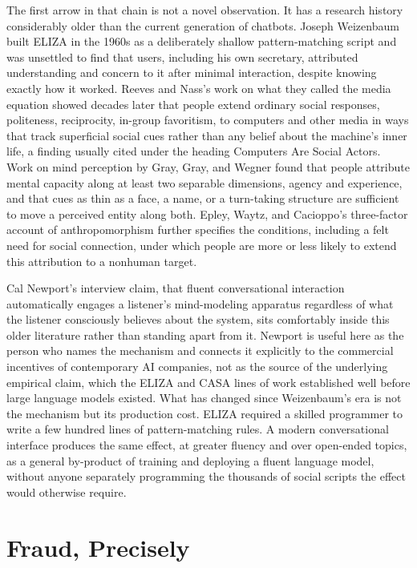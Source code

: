 \documentclass[11pt]{article}
\begin{document}
The first arrow in that chain is not a novel observation. It has a research history considerably older than the current generation of chatbots. Joseph Weizenbaum built ELIZA in the 1960s\cite{weizenbaum} as a deliberately shallow pattern-matching script and was unsettled to find that users, including his own secretary, attributed understanding and concern to it after minimal interaction, despite knowing exactly how it worked. Reeves and Nass's work on what they called the media equation\cite{reevesnass,nasssteuertauber} showed decades later that people extend ordinary social responses, politeness, reciprocity, in-group favoritism, to computers and other media in ways that track superficial social cues rather than any belief about the machine's inner life, a finding usually cited under the heading Computers Are Social Actors. Work on mind perception by Gray, Gray, and Wegner\cite{graygraywegner} found that people attribute mental capacity along at least two separable dimensions, agency and experience, and that cues as thin as a face, a name, or a turn-taking structure are sufficient to move a perceived entity along both. Epley, Waytz, and Cacioppo's three-factor account of anthropomorphism\cite{epleywaytzcacioppo} further specifies the conditions, including a felt need for social connection, under which people are more or less likely to extend this attribution to a nonhuman target.

Cal Newport's interview claim, that fluent conversational interaction automatically engages a listener's mind-modeling apparatus regardless of what the listener consciously believes about the system, sits comfortably inside this older literature rather than standing apart from it. Newport is useful here as the person who names the mechanism and connects it explicitly to the commercial incentives of contemporary AI companies, not as the source of the underlying empirical claim, which the ELIZA and CASA lines of work established well before large language models existed. What has changed since Weizenbaum's era is not the mechanism but its production cost. ELIZA required a skilled programmer to write a few hundred lines of pattern-matching rules. A modern conversational interface produces the same effect, at greater fluency and over open-ended topics, as a general by-product of training and deploying a fluent language model, without anyone separately programming the thousands of social scripts the effect would otherwise require.

\section{Fraud, Precisely}
\label{sec:fraud}
\end{document}
